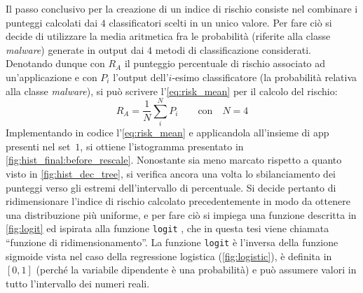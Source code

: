 \documentclass[12pt,a4paper,oneside]{article}
\begin{document}
Il passo conclusivo per la creazione di un indice di rischio consiste nel combinare i punteggi calcolati dai $4$ classificatori scelti in un unico valore. Per fare ciò si decide di utilizzare la media aritmetica fra le probabilità (riferite alla classe \textit{malware}) generate in output dai $4$ metodi di classificazione considerati. Denotando dunque con $R_A$ il punteggio percentuale di rischio associato ad un'applicazione e con $P_i$ l'output dell'$i$-esimo classificatore (la probabilità relativa alla classe \textit{malware}), si può scrivere l'\cref{eq:risk_mean} per il calcolo del rischio:
\begin{equation}\label{eq:risk_mean}
R_A = \dfrac{1}{N} \sum_{i}^{N} P_i \qquad \text{con} \quad N = 4
\end{equation}
Implementando in codice l'\cref{eq:risk_mean} e applicandola all'insieme di app presenti nel set~$1$, si ottiene l'istogramma presentato in \cref{fig:hist_final:before_rescale}. Nonostante sia meno marcato rispetto a quanto visto in \cref{fig:hist_dec_tree}, si verifica ancora una volta lo sbilanciamento dei punteggi verso gli estremi dell'intervallo di percentuale. Si decide pertanto di ridimensionare l'indice di rischio calcolato precedentemente in modo da ottenere una distribuzione più uniforme, e per fare ciò si impiega una funzione descritta in \cref{fig:logit} ed ispirata alla funzione \texttt{logit} \cite{PATTERN_RECOGNITION}, che in questa tesi viene chiamata ``funzione di ridimensionamento''. La funzione \texttt{logit} è l'inversa della funzione sigmoide vista nel caso della regressione logistica (\cref{fig:logistic}), è definita in $[0,1]$ (perché la variabile dipendente è una probabilità) e può assumere valori in tutto l'intervallo dei numeri reali.
\end{document}
